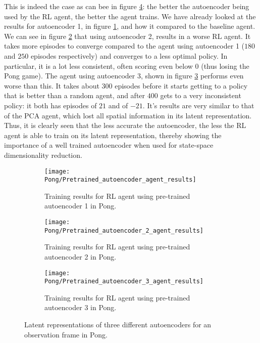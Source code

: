 This is indeed the case as can bee in figure \ref{fig:ae-results-pong}: the better the autoencoder being used by the RL agent, the better the agent trains. We have already looked at the results for autoencoder 1, in figure \ref{fig:ae1-results-pong}, and how it compared to the baseline agent. We can see in figure \ref{fig:ae2-results-pong} that using autoencoder 2, results in a worse RL agent. It takes more episodes to converge compared to the agent using autoencoder 1 ($180$ and $250$ episodes respectively) and converges to a less optimal policy. In particular, it is a lot less consistent, often scoring even below $0$ (thus losing the Pong game). The agent using autoencoder 3, shown in figure \ref{fig:ae3-results-pong} performs even worse than this. It takes about $300$ episodes before it starts getting to a policy that is better than a random agent, and after $400$ gets to a very inconsistent policy: it both has episodes of $21$ and of $-21$. It's results are very similar to that of the PCA agent, which lost all spatial information in its latent representation. Thus, it is clearly seen that the less accurate the autoencoder, the less the RL agent is able to train on its latent representation, thereby showing the importance of a well trained autoencoder when used for state-space dimensionality reduction.


\begin{figure}[h!]
	\centering
	\begin{subfigure}[b]{0.5\textwidth}
		\texttt{[image: Pong/Pretrained\_autoencoder\_agent\_results]}
		\caption{Training results for RL agent using pre-trained autoencoder 1 in Pong.}
		\label{fig:ae1-results-pong}
	\end{subfigure}
	\begin{subfigure}[b]{0.5\textwidth}
		\texttt{[image: Pong/Pretrained\_autoencoder\_2\_agent\_results]}
		\caption{Training results for RL agent using pre-trained autoencoder 2 in Pong.}
		\label{fig:ae2-results-pong}
	\end{subfigure}
	\begin{subfigure}[b]{0.5\textwidth}
		\texttt{[image: Pong/Pretrained\_autoencoder\_3\_agent\_results]}
		\caption{Training results for RL agent using pre-trained autoencoder 3 in Pong.}
		\label{fig:ae3-results-pong}
	\end{subfigure}
	\caption{Latent representations of three different autoencoders for an observation frame in Pong.}
	\label{fig:ae-results-pong}
\end{figure}

